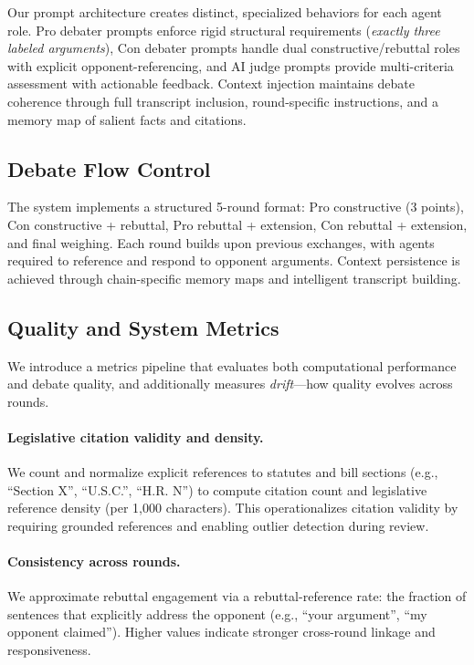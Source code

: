 \documentclass{article}
\begin{document}
Our prompt architecture creates distinct, specialized behaviors for each agent role. Pro debater prompts enforce rigid structural requirements (\emph{exactly three labeled arguments}), Con debater prompts handle dual constructive/rebuttal roles with explicit opponent-referencing, and AI judge prompts provide multi-criteria assessment with actionable feedback. Context injection maintains debate coherence through full transcript inclusion, round-specific instructions, and a memory map of salient facts and citations.

\subsection{Debate Flow Control}

The system implements a structured 5-round format: Pro constructive (3 points), Con constructive + rebuttal, Pro rebuttal + extension, Con rebuttal + extension, and final weighing. Each round builds upon previous exchanges, with agents required to reference and respond to opponent arguments. Context persistence is achieved through chain-specific memory maps and intelligent transcript building.

\subsection{Quality and System Metrics}

We introduce a metrics pipeline that evaluates both computational performance and debate quality, and additionally measures \emph{drift}—how quality evolves across rounds.

\paragraph{Legislative citation validity and density.} We count and normalize explicit references to statutes and bill sections (e.g., ``Section X'', ``U.S.C.'', ``H.R. N'') to compute citation count and legislative reference density (per 1{,}000 characters). This operationalizes citation validity by requiring grounded references and enabling outlier detection during review.

\paragraph{Consistency across rounds.} We approximate rebuttal engagement via a rebuttal-reference rate: the fraction of sentences that explicitly address the opponent (e.g., ``your argument'', ``my opponent claimed''). Higher values indicate stronger cross-round linkage and responsiveness.
\end{document}
